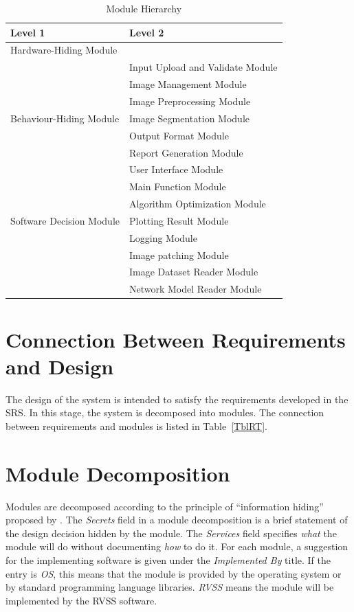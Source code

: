 \documentclass[12pt, titlepage]{article}
\begin{document}
\begin{table}[h!]
\centering
\begin{tabular}{p{} p{}}
\toprule
\textbf{Level 1} & \textbf{Level 2}\\
\midrule
{Hardware-Hiding Module} & ~ \\
\midrule

\multirow{7}{0.3\textwidth}{Behaviour-Hiding Module} 
& Input Upload and Validate Module\\ 
& Image Management Module\\
& Image Preprocessing Module\\
& Image Segmentation Module\\
& Output Format Module\\
& Report Generation Module\\
& User Interface Module\\
& Main Function Module\\
\midrule

\multirow{3}{0.3\textwidth}{Software Decision Module} 
& Algorithm Optimization Module\\
& Plotting Result Module\\
& Logging Module\\
& Image patching Module\\
& Image Dataset Reader Module\\
& Network Model Reader Module\\
\bottomrule

\end{tabular}
\caption{Module Hierarchy}
\label{TblMH}
\end{table}

\section{Connection Between Requirements and Design} \label{SecConnection}

The design of the system is intended to satisfy the requirements developed in the SRS. In this stage, the system is decomposed into modules. The connection between requirements and modules is listed in Table~\ref{TblRT}.

\section{Module Decomposition} \label{SecMD}

Modules are decomposed according to the principle of ``information hiding'' proposed by \citet{parnas1985modular}. The \emph{Secrets} field in a module decomposition is a brief statement of the design decision hidden by the
module. The \emph{Services} field specifies \emph{what} the module will do without documenting \emph{how} to do it. For each module, a suggestion for the implementing software is given under the \emph{Implemented By} title. If the entry is \emph{OS}, this means that the module is provided by the operating system or by standard programming language libraries.  \emph{RVSS} means the module will be implemented by the RVSS software.
\end{document}
